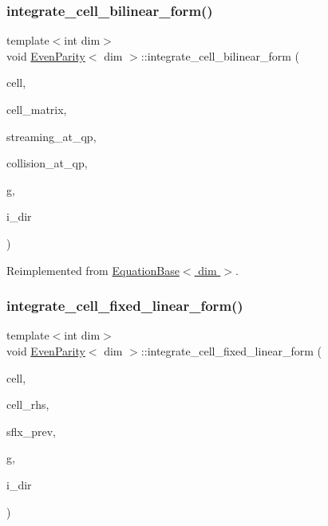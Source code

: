 \subsubsection{\texorpdfstring{integrate\+\_\+cell\+\_\+bilinear\+\_\+form()}{integrate\_cell\_bilinear\_form()}}
{\footnotesize\ttfamily template$<$int dim$>$ \\
void \hyperlink{class_even_parity}{Even\+Parity}$<$ dim $>$\+::integrate\+\_\+cell\+\_\+bilinear\+\_\+form (\begin{DoxyParamCaption}\item[{typename Do\+F\+Handler$<$ dim $>$\+::active\+\_\+cell\+\_\+iterator \&}]{cell,  }\item[{Full\+Matrix$<$ double $>$ \&}]{cell\+\_\+matrix,  }\item[{std\+::vector$<$ std\+::vector$<$ Full\+Matrix$<$ double $>$ $>$ $>$ \&}]{streaming\+\_\+at\+\_\+qp,  }\item[{std\+::vector$<$ Full\+Matrix$<$ double $>$ $>$ \&}]{collision\+\_\+at\+\_\+qp,  }\item[{const unsigned int \&}]{g,  }\item[{const unsigned int \&}]{i\+\_\+dir }\end{DoxyParamCaption})\hspace{0.3cm}{\ttfamily [virtual]}}



Reimplemented from \hyperlink{class_equation_base_a7421b3c18433975ac794ac22c3af715a}{Equation\+Base$<$ dim $>$}.

\mbox{\label{class_even_parity_a5efaf943f1bde0b3f9a62ea8f5dc5ff0}} 
\subsubsection{\texorpdfstring{integrate\+\_\+cell\+\_\+fixed\+\_\+linear\+\_\+form()}{integrate\_cell\_fixed\_linear\_form()}}
{\footnotesize\ttfamily template$<$int dim$>$ \\
void \hyperlink{class_even_parity}{Even\+Parity}$<$ dim $>$\+::integrate\+\_\+cell\+\_\+fixed\+\_\+linear\+\_\+form (\begin{DoxyParamCaption}\item[{typename Do\+F\+Handler$<$ dim $>$\+::active\+\_\+cell\+\_\+iterator \&}]{cell,  }\item[{Vector$<$ double $>$ \&}]{cell\+\_\+rhs,  }\item[{std\+::vector$<$ Vector$<$ double $>$ $>$ \&}]{sflx\+\_\+prev,  }\item[{const unsigned int \&}]{g,  }\item[{const unsigned int \&}]{i\+\_\+dir }\end{DoxyParamCaption})\hspace{0.3cm}{\ttfamily [virtual]}}



